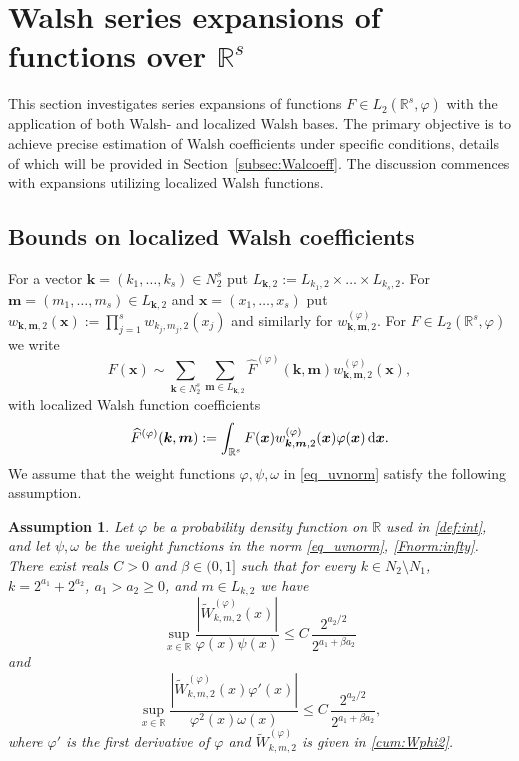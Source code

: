 \documentclass[namedate,webpdf,imanum]{ima-authoring-arxiv}%
\theoremstyle{thmstyletwo}%
\newtheorem{assumption}{Assumption}
\numberwithin{equation}{section}
\newcommand{\rd}{\, {\rm d}}
\newcommand{\bsx}{\boldsymbol{x}}
\newcommand{\bsk}{\boldsymbol{k}}
\newcommand{\bsm}{\boldsymbol{m}}
\newcommand{\RR}{\mathbb{R}}
\begin{document}
\section{Walsh series expansions of functions over $\mathbb{R}^s$}\label{sec:serexp}



This section investigates series expansions of functions $F \in L_2(\mathbb{R}^s,\varphi)$ with the application of both Walsh- and localized Walsh bases. The primary objective is to achieve precise estimation of Walsh coefficients under specific conditions, details of which will be provided in Section~\ref{subsec:Walcoeff}. The discussion commences with expansions utilizing localized Walsh functions.

 

\subsection{Bounds on localized Walsh coefficients}

For a vector $\bsk=(k_1,\ldots,k_s) \in N_2^s$ put $L_{\bsk,2} :=L_{k_1,2} \times \ldots \times L_{k_s,2}$. For $\bsm =(m_1,\ldots,m_s) \in L_{\bsk,2}$ and $\bsx=(x_1,\ldots,x_s)$ put $w_{\bsk,\bsm,2}(\bsx):= \prod_{j=1}^s w_{k_j,m_j,2}(x_j)$ and similarly for $w_{\bsk,\bsm,2}^{(\varphi)}$. For $F \in L_2(\mathbb{R}^s,\varphi)$ we write
\begin{equation*}
F(\bsx) \sim \sum_{\bsk \in N_2^s} \sum_{\bsm \in L_{\bsk,2}} \widehat{F}^{(\varphi)}(\bsk, \bsm) w^{(\varphi)}_{\bsk,\bsm,2}(\bsx),
\end{equation*}
with localized Walsh function coefficients
\begin{equation*}
\widehat{F}^{(\varphi)}(\bsk,\bsm) := \int_{\mathbb{R}^s} F(\bsx) w^{(\varphi)}_{\bsk,\bsm,2}(\bsx) \varphi(\bsx) \rd \bsx.
\end{equation*}
We assume that the weight functions $\varphi, \psi, \omega$ in \eqref{eq_uvnorm} satisfy the following assumption.


\begin{assumption}\label{assumptionA}
Let $\varphi$ be a probability density function on $\mathbb{R}$ used in \eqref{def:int}, and let $\psi, \omega$ be the weight functions in the norm \eqref{eq_uvnorm}, \eqref{Fnorm:infty}. There exist reals $C>0$ and $\beta \in (0,1]$ such that for every $k \in N_2 \setminus N_1$, $k=2^{a_1}+2^{a_2}$, $a_1 > a_2 \ge 0$, and $m \in L_{k,2}$ we have
$$\sup_{x \in \RR} \frac{|\widetilde{W}_{k,m,2}^{(\varphi)}(x)|}{\varphi(x) \psi(x)} \le C \, \frac{ 2^{a_2/2} }{2^{a_1+ \beta a_2}}$$
and
$$\sup_{x \in \RR} \frac{|\widetilde{W}_{k,m,2}^{(\varphi)}(x) \varphi'(x)|}{\varphi^2(x) \omega(x)} \le C\, \frac{ 2^{a_2/2} }{2^{a_1+ \beta a_2}},$$
where $\varphi'$ is the first derivative of $\varphi$ and $\widetilde{W}^{(\varphi)}_{k,m,2}$ is given in \eqref{cum:Wphi2}.
\end{assumption}
\end{document}
